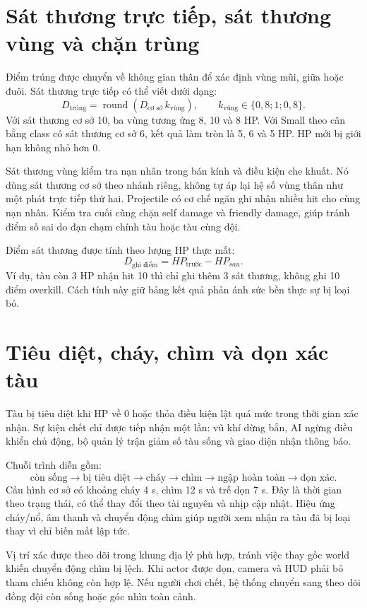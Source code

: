 \documentclass[11pt,a4paper,oneside]{report}
\begin{document}
\section{Sát thương trực tiếp, sát thương vùng và chặn trùng}
Điểm trúng được chuyển về không gian thân để xác định vùng mũi, giữa hoặc đuôi. Sát thương trực tiếp có thể viết dưới dạng:
\begin{equation}
 D_{\text{trúng}}=\operatorname{round}(D_{\text{cơ sở}}\,k_{\text{vùng}}),\qquad
 k_{\text{vùng}}\in\{0{,}8;1;0{,}8\}.
\end{equation}
Với sát thương cơ sở 10, ba vùng tương ứng 8, 10 và 8 HP. Với Small theo cân bằng class có sát thương cơ sở 6, kết quả làm tròn là 5, 6 và 5 HP. HP mới bị giới hạn không nhỏ hơn 0.

Sát thương vùng kiểm tra nạn nhân trong bán kính và điều kiện che khuất. Nó dùng sát thương cơ sở theo nhánh riêng, không tự áp lại hệ số vùng thân như một phát trực tiếp thứ hai. Projectile có cơ chế ngăn ghi nhận nhiều hit cho cùng nạn nhân. Kiểm tra cuối cũng chặn self damage và friendly damage, giúp tránh điểm số sai do đạn chạm chính tàu hoặc tàu cùng đội.

Điểm sát thương được tính theo lượng HP thực mất:
\[
 D_{\text{ghi điểm}}=HP_{\text{trước}}-HP_{sau}.
\]
Ví dụ, tàu còn 3 HP nhận hit 10 thì chỉ ghi thêm 3 sát thương, không ghi 10 điểm overkill. Cách tính này giữ bảng kết quả phản ánh sức bền thực sự bị loại bỏ.

\section{Tiêu diệt, cháy, chìm và dọn xác tàu}
Tàu bị tiêu diệt khi HP về 0 hoặc thỏa điều kiện lật quá mức trong thời gian xác nhận. Sự kiện chết chỉ được tiếp nhận một lần: vũ khí dừng bắn, AI ngừng điều khiển chủ động, bộ quản lý trận giảm số tàu sống và giao diện nhận thông báo.

Chuỗi trình diễn gồm:
\[
 \text{còn sống}\rightarrow\text{bị tiêu diệt}\rightarrow\text{cháy}
 \rightarrow\text{chìm}\rightarrow\text{ngập hoàn toàn}\rightarrow\text{dọn xác}.
\]
Cấu hình cơ sở có khoảng cháy 4 s, chìm 12 s và trễ dọn 7 s. Đây là thời gian theo trạng thái, có thể thay đổi theo tài nguyên và nhịp cập nhật. Hiệu ứng cháy/nổ, âm thanh và chuyển động chìm giúp người xem nhận ra tàu đã bị loại thay vì chỉ biến mất lập tức.

Vị trí xác được theo dõi trong khung địa lý phù hợp, tránh việc thay gốc world khiến chuyển động chìm bị lệch. Khi actor được dọn, camera và HUD phải bỏ tham chiếu không còn hợp lệ. Nếu người chơi chết, hệ thống chuyển sang theo dõi đồng đội còn sống hoặc góc nhìn toàn cảnh.
\end{document}
